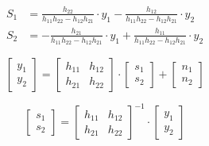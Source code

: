 \documentclass{ltjsarticle}
\begin{document}
\begin{align*}
  S_1 &= \frac{h_{22}}{h_{11}h_{22} - h_{12}h_{21}} \cdot y_1 - \frac{h_{12}}{h_{11}h_{22} - h_{12}h_{21}} \cdot y_2\\
  S_2 &= - \frac{h_{21}}{h_{11}h_{22} - h_{12}h_{21}} \cdot y_1 + \frac{h_{11}}{h_{11}h_{22} - h_{12}h_{21}} \cdot y_2
\end{align*}




\begin{equation*}
  \begin{bmatrix}
    y_1 \\
    y_2
    \end{bmatrix}
    =
    \begin{bmatrix}
    h_{11} & h_{12} \\
    h_{21} & h_{22}
    \end{bmatrix}
    \cdot
    \begin{bmatrix}
    s_1 \\
    s_2
    \end{bmatrix}
    +
    \begin{bmatrix}
      n_1\\
      n_2
    \end{bmatrix}
\end{equation*}

\begin{equation*}
  \begin{bmatrix}
    s_1 \\
    s_2
    \end{bmatrix}
    =
    \begin{bmatrix}
    h_{11} & h_{12} \\
    h_{21} & h_{22}
    \end{bmatrix}^{-1}
    \cdot
    \begin{bmatrix}
    y_1 \\
    y_2
    \end{bmatrix}
\end{equation*}
\end{document}
